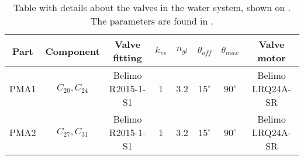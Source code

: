 \begin{table}[]
\centering
\begin{adjustbox}{max width=\textwidth}
\begin{tabular}{c|c|c|c|c|c|c|c}
Part & Component 		& Valve fitting 	& $k_{vs}$  & $n_{gl}$  & $\theta_{off}$ & $\theta_{max}$ & Valve motor 	 \\ \hline
PMA1 & $C_{20}, C_{24}$ & Belimo R2015-1-S1 & 1 		& 3.2 		& $15^\circ$	 & $90^\circ$ 	  & Belimo LRQ24A-SR \\
PMA2 & $C_{27}, C_{31}$ & Belimo R2015-1-S1 & 1 		& 3.2 		& $15^\circ$   	 & $90^\circ$ 	  & Belimo LRQ24A-SR
\end{tabular}
\end{adjustbox}
\caption{Table with details about the valves in the water system, shown on . The parameters are found in \citep{Belimo1, Belimo2}.}
\label{tab:pip_detail}
\end{table}

